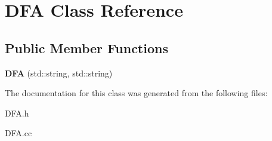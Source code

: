 \hypertarget{classDFA}{}\section{D\+FA Class Reference}
\label{classDFA}
\subsection*{Public Member Functions}
\begin{DoxyCompactItemize}
\item 
\mbox{\label{classDFA_a69571967ef142033f6794ef249bc6b3a}} 
{\bfseries D\+FA} (std\+::string, std\+::string)
\end{DoxyCompactItemize}


The documentation for this class was generated from the following files\+:\begin{DoxyCompactItemize}
\item 
D\+F\+A.\+h\item 
D\+F\+A.\+cc\end{DoxyCompactItemize}

